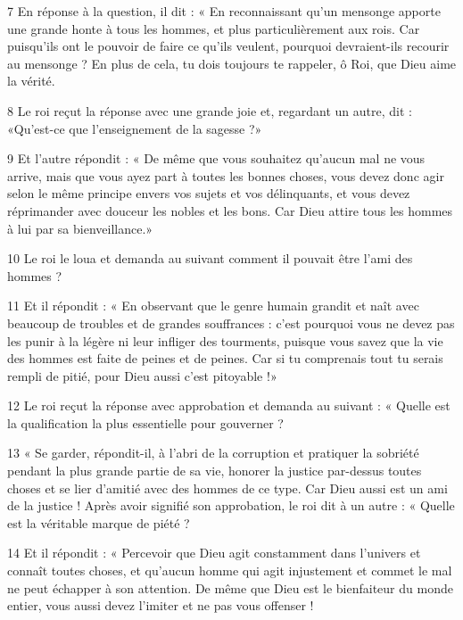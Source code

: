 \par 7 En réponse à la question, il dit : « En reconnaissant qu'un mensonge apporte une grande honte à tous les hommes, et plus particulièrement aux rois. Car puisqu’ils ont le pouvoir de faire ce qu’ils veulent, pourquoi devraient-ils recourir au mensonge ? En plus de cela, tu dois toujours te rappeler, ô Roi, que Dieu aime la vérité.

\par 8 Le roi reçut la réponse avec une grande joie et, regardant un autre, dit : «Qu'est-ce que l'enseignement de la sagesse ?»

\par 9 Et l'autre répondit : « De même que vous souhaitez qu'aucun mal ne vous arrive, mais que vous ayez part à toutes les bonnes choses, vous devez donc agir selon le même principe envers vos sujets et vos délinquants, et vous devez réprimander avec douceur les nobles et les bons. Car Dieu attire tous les hommes à lui par sa bienveillance.»

\par 10 Le roi le loua et demanda au suivant comment il pouvait être l'ami des hommes ?

\par 11 Et il répondit : « En observant que le genre humain grandit et naît avec beaucoup de troubles et de grandes souffrances : c'est pourquoi vous ne devez pas les punir à la légère ni leur infliger des tourments, puisque vous savez que la vie des hommes est faite de peines et de peines. Car si tu comprenais tout tu serais rempli de pitié, pour Dieu aussi c'est pitoyable !»

\par 12 Le roi reçut la réponse avec approbation et demanda au suivant : « Quelle est la qualification la plus essentielle pour gouverner ?

\par 13 « Se garder, répondit-il, à l'abri de la corruption et pratiquer la sobriété pendant la plus grande partie de sa vie, honorer la justice par-dessus toutes choses et se lier d'amitié avec des hommes de ce type. Car Dieu aussi est un ami de la justice ! Après avoir signifié son approbation, le roi dit à un autre : « Quelle est la véritable marque de piété ?

\par 14 Et il répondit : « Percevoir que Dieu agit constamment dans l'univers et connaît toutes choses, et qu'aucun homme qui agit injustement et commet le mal ne peut échapper à son attention. De même que Dieu est le bienfaiteur du monde entier, vous aussi devez l'imiter et ne pas vous offenser !

